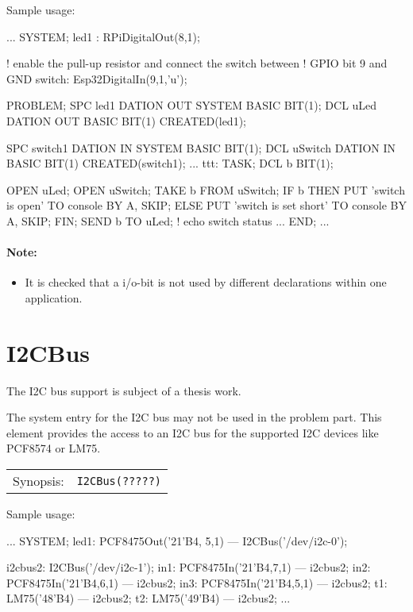 Sample usage:
\begin{PEARLCode}
...
SYSTEM;
  led1 : RPiDigitalOut(8,1);

  ! enable the pull-up resistor and connect the switch between 
  ! GPIO bit 9 and GND
  switch: Esp32DigitalIn(9,1,'u');

PROBLEM;
   SPC led1 DATION OUT SYSTEM BASIC BIT(1);
   DCL uLed DATION OUT BASIC BIT(1) CREATED(led1);

   SPC switch1 DATION IN SYSTEM BASIC BIT(1);
   DCL uSwitch DATION IN BASIC BIT(1) CREATED(switch1);
...
ttt: TASK;
   DCL b BIT(1);

   OPEN uLed;
   OPEN uSwitch;
   TAKE b FROM uSwitch;
   IF b THEN
      PUT 'switch is open' TO console BY A, SKIP;
   ELSE
      PUT 'switch is set short' TO console BY A, SKIP;
   FIN;
   SEND b TO uLed;  ! echo switch status
...
END;
...
\end{PEARLCode}

\paragraph{Note:}  
\begin{itemize}
\item It is checked that a i/o-bit is not used by different declarations within
one application.
\end{itemize}

 

\section{I2CBus}
The I2C bus support is subject of a thesis work.


The system entry for the I2C bus may not be used in the problem part. This element
provides the access to an I2C bus for the supported I2C devices like 
PCF8574 or LM75.

\begin{tabular}{ll}
Synopsis: & \verb|I2CBus(?????)|\\ 
\end{tabular}


Sample usage:
\begin{PEARLCode}
...
SYSTEM;
   led1: PCF8475Out('21'B4, 5,1) --- I2CBus('/dev/i2c-0');

   i2cbus2: I2CBus('/dev/i2c-1');
   in1: PCF8475In('21'B4,7,1) --- i2cbus2;
   in2: PCF8475In('21'B4,6,1) --- i2cbus2;
   in3: PCF8475In('21'B4,5,1) --- i2cbus2;
   t1: LM75('48'B4) --- i2cbus2;
   t2: LM75('49'B4) --- i2cbus2;
...
\end{PEARLCode}

